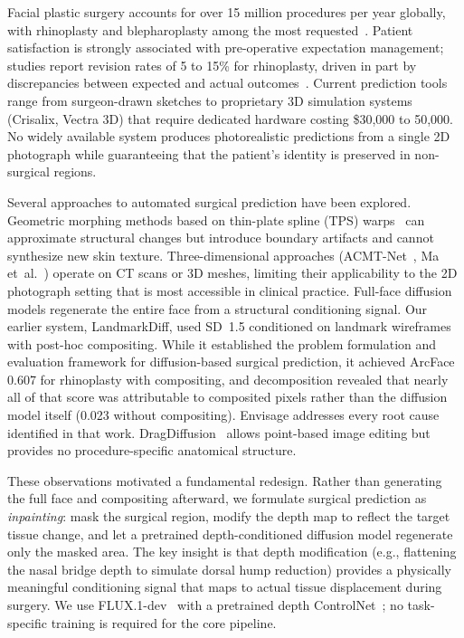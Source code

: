 \documentclass[runningheads]{llncs}
\newcommand{\method}{Envisage}
\begin{document}
Facial plastic surgery accounts for over 15 million procedures per
year globally, with rhinoplasty and blepharoplasty among the most
requested~\cite{asps2023stats}. Patient satisfaction is strongly
associated with pre-operative expectation management; studies report
revision rates of 5 to 15\% for rhinoplasty, driven in part by
discrepancies between expected and actual
outcomes~\cite{honigman2004review,sarwer2008body}. Current prediction
tools range from surgeon-drawn sketches to proprietary 3D simulation
systems (Crisalix, Vectra 3D) that require dedicated hardware costing
\$30,000 to 50,000. No widely available system produces photorealistic
predictions from a single 2D photograph while guaranteeing that the
patient's identity is preserved in non-surgical regions.

Several approaches to automated surgical prediction have been explored.
Geometric morphing methods based on thin-plate spline (TPS)
warps~\cite{bookstein1989tps} can approximate structural changes but
introduce boundary artifacts and cannot synthesize new skin texture.
Three-dimensional approaches (ACMT-Net~\cite{li2023acmt},
Ma et~al.~\cite{ma2023gposc}) operate on CT scans or 3D meshes,
limiting their applicability to the 2D photograph setting that is
most accessible in clinical practice. Full-face diffusion models
regenerate the entire face from a structural conditioning signal.
Our earlier system, LandmarkDiff, used SD~1.5 conditioned on landmark
wireframes with post-hoc compositing. While it established the problem
formulation and evaluation framework for diffusion-based surgical
prediction, it achieved ArcFace 0.607 for rhinoplasty with compositing, and
decomposition revealed that nearly all of that score was attributable to
composited pixels rather than the diffusion model itself (0.023 without
compositing). \method{} addresses every root cause identified in that
work.
DragDiffusion~\cite{shi2024dragdiffusion} allows point-based image
editing but provides no procedure-specific anatomical structure.

These observations motivated a fundamental redesign. Rather than
generating the full face and compositing afterward, we formulate
surgical prediction as \emph{inpainting}: mask the surgical region,
modify the depth map to reflect the target tissue change, and let a
pretrained depth-conditioned diffusion model regenerate only the masked
area. The key insight is that depth modification (e.g., flattening the
nasal bridge depth to simulate dorsal hump reduction) provides a
physically meaningful conditioning signal that maps to actual tissue
displacement during surgery. We use FLUX.1-dev~\cite{flux2024} with a
pretrained depth ControlNet~\cite{zhang2023controlnet}; no
task-specific training is required for the core pipeline.
\end{document}
